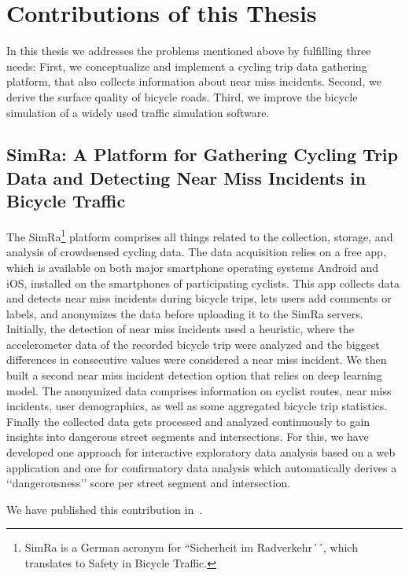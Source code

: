 \section{Contributions of this Thesis}
\label{sec:contributions}
In this thesis we addresses the problems mentioned above by fulfilling three needs:
First, we conceptualize and implement a cycling trip data gathering platform, that also collects information about near miss incidents.
Second, we derive the surface quality of bicycle roads.
Third, we improve the bicycle simulation of a widely used traffic simulation software.

\subsection{SimRa: A Platform for Gathering Cycling Trip Data and Detecting Near Miss Incidents in Bicycle Traffic}
\label{subsec:simra_contribution}
The SimRa\footnote{SimRa is a German acronym for ``Sicherheit im Radverkehr´´, which translates to Safety in Bicycle Traffic.} platform comprises all things related to the collection, storage, and analysis of crowdsensed cycling data.
The data acquisition relies on a free app, which is available on both major smartphone operating systems Android and iOS, installed on the smartphones of participating cyclists.
This app collects data and detects near miss incidents during bicycle trips, lets users add comments or labels, and anonymizes the data before uploading it to the SimRa servers.
Initially, the detection of near miss incidents used a heuristic, where the accelerometer data of the recorded bicycle trip were analyzed and the biggest differences in consecutive values were considered a near miss incident.
We then built a second near miss incident detection option that relies on deep learning model.
The anonymized data comprises information on cyclist routes, near miss incidents, user demographics, as well as some aggregated bicycle trip statistics.
Finally the collected data gets processed and analyzed continuously to gain insights into dangerous street segments and intersections.
For this, we have developed one approach for interactive exploratory data analysis based on a web application and one for confirmatory data analysis which automatically derives a ‘‘dangerousness’’ score per street segment and intersection. 

We have published this contribution in~\cite{karakaya2020simra,karakaya2022cyclesense}.

